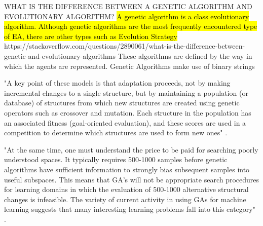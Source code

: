 


WHAT IS THE DIFFERENCE BETWEEN A GENETIC ALGORITHM AND EVOLUTIONARY ALGORITHM?
\hl{A genetic algorithm is a class evolutionary algorithm. Although genetic algorithms are the most frequently encountered type of EA, there are other types such as Evolution Strategy}
https://stackoverflow.com/questions/2890061/what-is-the-difference-between-genetic-and-evolutionary-algorithms
These algorithms are defined by the way in which the agents are represented. Genetic Algorithms make use of binary strings








"A key point of these models is that adaptation proceeds, not by making incremental changes to a single structure, but by maintaining a population (or database) of structures from which new structures are created using genetic operators such as crossover and mutation. Each structure in the population has an associated fitness (goal-oriented evaluation), and these scores are used in a competition to determine which structures are used to form new ones" \cite{de1988learning}.


"At the same time, one must understand the price to be paid for searching poorly understood spaces. It typically requires 500-1000 samples before genetic algorithms have sufficient information to strongly bias subsequent samples into useful subspaces. This means that GA's will not be appropriate search procedures for learning domains in which the evaluation of 500-1000 alternative structural changes is infeasible. The variety of current activity in using GAs for machine learning suggests that many interesting learning problems fall into this category" \cite{de1988learning}.

